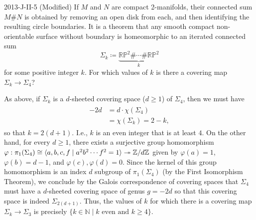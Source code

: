 \documentclass{article}
\begin{document}
	\begin{prb}{2013-J-II-5 (Modified)}
		If $M$ and $N$ are compact 2-manifolds, their connected sum $M\#N$ is obtained by removing an open disk from each, and then identifying the resulting circle boundaries. It is a theorem that any smooth compact non-orientable surface without boundary is homeomorphic to an iterated connected sum
		\begin{equation*}
			\Sigma_{k} \coloneqq \underbrace{\mathbb{RP}^{2}\#\dotsm \# \mathbb{RP}^{2}}_{k}
		\end{equation*}
		for some positive integer $k$. For which values of $k$ is there a covering map $\Sigma_{k} \to \Sigma_{4}$? 
	\end{prb}
	As above, if $\Sigma_{k}$ is a $d$-sheeted covering space ($d \geq 1$) of $\Sigma_{4}$, then we must have 
	\begin{align*}
		\begin{split}
			-2d &= d\cdot\chi(\Sigma_{4}) \\
			&= \chi(\Sigma_{k}) = 2 - k, 
		\end{split}
	\end{align*}
	so that $k =2(d + 1)$. I.e., $k$ is an even integer that is at least $4$. On the other hand, for every $d \geq 1$, there exists a surjective group homomorphism $\varphi: \pi_{1}(\Sigma_{4}) \cong \braket{a, b, c, f\mid a^{2}b^{2}\dotsm f^{2} = 1} \twoheadrightarrow \mathbb{Z}/d\mathbb{Z}$ given by $\varphi(a) = 1$, $\varphi(b)= d- 1$, and $\varphi(c), \varphi(d) = 0$. Since the kernel of this group homomorphism is an index $d$ subgroup of $\pi_{1}(\Sigma_{4})$ (by the First Isomorphism Theorem), we conclude by the Galois correspondence of covering spaces that $\Sigma_{4}$ must have a $d$-sheeted covering space of genus $g = -2d$ so that this covering space is indeed $\Sigma_{2(d + 1)}$. Thus, the values of $k$ for which there is a covering map $\Sigma_{k} \to \Sigma_{3}$ is precisely $\{k \in \mathbb{N} \mid k \text{ even and } k \geq 4\}$. 
	
\end{document}
